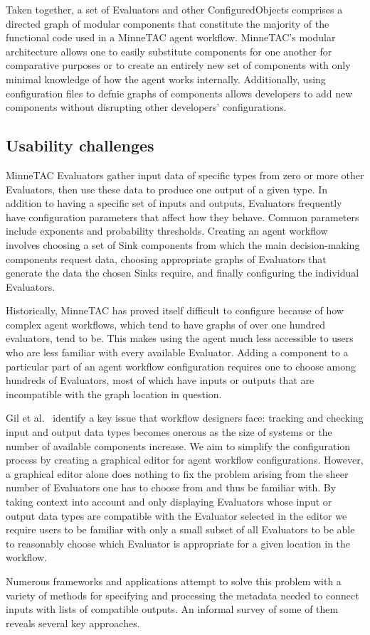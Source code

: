 \documentclass{elsart}
\begin{document}
Taken together, a set of Evaluators and other ConfiguredObjects comprises
a directed graph of modular components that constitute the majority
of the functional code used in a MinneTAC agent workflow.  MinneTAC's
modular architecture allows one to easily substitute components for one
another for comparative purposes or to create an entirely new set of
components with only minimal knowledge of how the agent works internally.
Additionally, using configuration files to defnie graphs of components
allows developers to add new components without disrupting other
developers' configurations.

\subsection{Usability challenges}

MinneTAC Evaluators gather input data of specific types from zero or
more other Evaluators, then use these data to produce one output of a
given type.  In addition to having a specific set of inputs and outputs,
Evaluators frequently have configuration parameters that affect how they
behave.  Common parameters include exponents and probability thresholds.
Creating an agent workflow involves choosing a set of Sink components
from which the main decision-making components request data, choosing
appropriate graphs of Evaluators that generate the data the chosen Sinks
require, and finally configuring the individual Evaluators.

Historically, MinneTAC has proved itself difficult to configure because of
how complex agent workflows, which tend to have graphs of over one hundred
evaluators, tend to be.  This makes using the agent much less accessible
to users who are less familiar with every available Evaluator.  Adding a
component to a particular part of an agent workflow configuration requires
one to choose among hundreds of Evaluators, most of which have inputs
or outputs that are incompatible with the graph location in question.

Gil et al.~\cite{gil2010wings} identify a key issue that workflow
designers face: tracking and checking input and output data types becomes
onerous as the size of systems or the number of available components
increase.  We aim to simplify the configuration process by creating a
graphical editor for agent workflow configurations.  However, a graphical
editor alone does nothing to fix the problem arising from the sheer
number of Evaluators one has to choose from and thus be familiar with.
By taking context into account and only displaying Evaluators whose
input or output data types are compatible with the Evaluator selected
in the editor we require users to be familiar with only a small subset
of all Evaluators to be able to reasonably choose which Evaluator is
appropriate for a given location in the workflow.

Numerous frameworks and applications attempt to solve this problem with a variety of methods for specifying and processing the metadata needed to connect inputs with lists of compatible outputs.  An informal survey of some of them reveals several key approaches.
\end{document}

